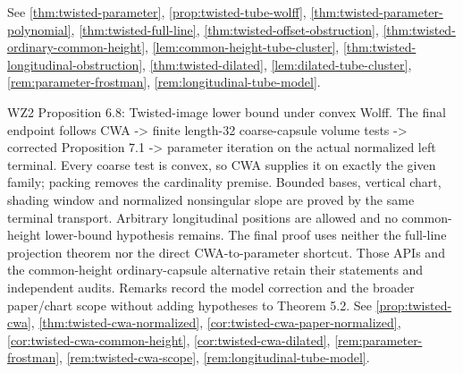 \begin{remark}
See \ref{thm:twisted-parameter}, \ref{prop:twisted-tube-wolff}, \ref{thm:twisted-parameter-polynomial}, \ref{thm:twisted-full-line}, \ref{thm:twisted-offset-obstruction}, \ref{thm:twisted-ordinary-common-height}, \ref{lem:common-height-tube-cluster}, \ref{thm:twisted-longitudinal-obstruction}, \ref{thm:twisted-dilated}, \ref{lem:dilated-tube-cluster}, \ref{rem:parameter-frostman}, \ref{rem:longitudinal-tube-model}.
\end{remark}

\begin{remark}
\label{rem:atlas-W2P6_8}
WZ2 Proposition 6.8: Twisted-image lower bound under convex Wolff.
The final endpoint follows CWA -> finite length-32 coarse-capsule volume tests -> corrected Proposition 7.1 -> parameter iteration on the actual normalized left terminal. Every coarse test is convex, so CWA supplies it on exactly the given family; packing removes the cardinality premise. Bounded bases, vertical chart, shading window and normalized nonsingular slope are proved by the same terminal transport. Arbitrary longitudinal positions are allowed and no common-height lower-bound hypothesis remains. The final proof uses neither the full-line projection theorem nor the direct CWA-to-parameter shortcut. Those APIs and the common-height ordinary-capsule alternative retain their statements and independent audits. Remarks record the model correction and the broader paper/chart scope without adding hypotheses to Theorem 5.2.
See \ref{prop:twisted-cwa}, \ref{thm:twisted-cwa-normalized}, \ref{cor:twisted-cwa-paper-normalized}, \ref{cor:twisted-cwa-common-height}, \ref{cor:twisted-cwa-dilated}, \ref{rem:parameter-frostman}, \ref{rem:twisted-cwa-scope}, \ref{rem:longitudinal-tube-model}.
\end{remark}

